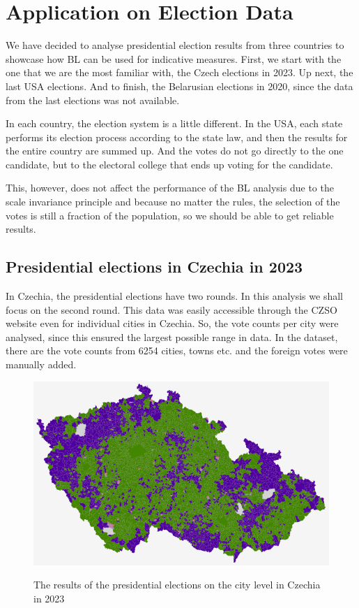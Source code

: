 \chapter{Application on Election Data} %


We have decided to analyse presidential election results from three countries to showcase how BL can be used for indicative measures. First, we start with the one that we are the most familiar with, the Czech elections in 2023. Up next, the last USA elections. And to finish, the Belarusian elections in 2020, since the data from the last elections was not available. 

In each country, the election system is a little different. In the USA, each state performs its election process according to the state law, and then the results for the entire country are summed up. And the votes do not go directly to the one candidate, but to the electoral college that ends up voting for the candidate. \cite{electoral-college}

This, however, does not affect the performance of the BL analysis due to the scale invariance principle and because no matter the rules, the selection of the votes is still a fraction of the population, so we should be able to get reliable results. 



\section{Presidential elections in Czechia in 2023}

In Czechia, the presidential elections have two rounds. In this analysis we shall focus on the second round. This data was easily accessible through the CZSO website even for individual cities in Czechia. So, the vote counts per city were analysed, since this ensured the largest possible range in data. In the dataset, there are the vote counts from 6254 cities, towns etc. and the foreign votes were manually added. 

\begin{figure}[h]
    \centering
    \caption{The results of the presidential elections on the city level in Czechia in 2023}
    \includegraphics[width=0.7\linewidth]{BT-DT-eng/TemplateBT-DT/img/cz-election-result.png}
    \label{fig:cz-election-result}
\end{figure}

